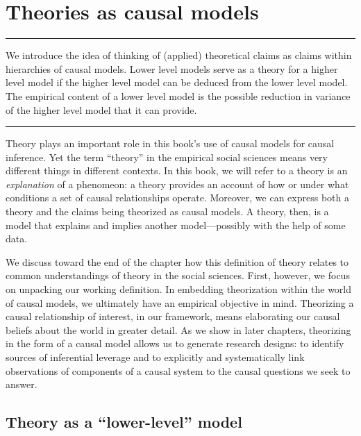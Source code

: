 \documentclass[12pt,]{book}
\begin{document}
\hypertarget{theory}{%
\chapter{Theories as causal models}\label{theory}}

\begin{center}\rule{0.5\linewidth}{\linethickness}\end{center}

We introduce the idea of thinking of (applied) theoretical claims as claims within hierarchies of causal models. Lower level models serve as a theory for a higher level model if the higher level model can be deduced from the lower level model. The empirical content of a lower level model is the possible reduction in variance of the higher level model that it can provide.

\begin{center}\rule{0.5\linewidth}{\linethickness}\end{center}

Theory plays an important role in this book's use of causal models for causal inference. Yet the term ``theory'' in the empirical social sciences means very different things in different contexts. In this book, we will refer to a theory is an \emph{explanation} of a phenomeon: a theory provides an account of how or under what conditions a set of causal relationships operate. Moreover, we can express both a theory and the claims being theorized as causal models. A theory, then, is a model that explains and implies another model---possibly with the help of some data.

We discuss toward the end of the chapter how this definition of theory relates to common understandings of theory in the social sciences. First, however, we focus on unpacking our working definition. In embedding theorization within the world of causal models, we ultimately have an empirical objective in mind. Theorizing a causal relationship of interest, in our framework, means elaborating our causal beliefs about the world in greater detail. As we show in later chapters, theorizing in the form of a causal model allows us to generate research designs: to identify sources of inferential leverage and to explicitly and systematically link observations of components of a causal system to the causal questions we seek to answer.

\hypertarget{theory-as-a-lower-level-model}{%
\section{Theory as a ``lower-level'' model}\label{theory-as-a-lower-level-model}}
\end{document}
